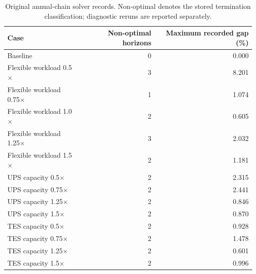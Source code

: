 \begin{table}[htbp]
\centering\small
\caption{Original annual-chain solver records. Non-optimal denotes the stored termination classification; diagnostic reruns are reported separately.}\label{tab:solver-quality}
\begin{tabular}{@{}lrr@{}}\toprule
Case & Non-optimal horizons & Maximum recorded gap (\%) \\\midrule
Baseline & 0 & 0.000 \\
Flexible workload 0.5$\times$ & 3 & 8.201 \\
Flexible workload 0.75$\times$ & 1 & 1.074 \\
Flexible workload 1.0$\times$ & 2 & 0.605 \\
Flexible workload 1.25$\times$ & 3 & 2.032 \\
Flexible workload 1.5$\times$ & 2 & 1.181 \\
UPS capacity 0.5$\times$ & 2 & 2.315 \\
UPS capacity 0.75$\times$ & 2 & 2.441 \\
UPS capacity 1.25$\times$ & 2 & 0.846 \\
UPS capacity 1.5$\times$ & 2 & 0.870 \\
TES capacity 0.5$\times$ & 2 & 0.928 \\
TES capacity 0.75$\times$ & 2 & 1.478 \\
TES capacity 1.25$\times$ & 2 & 0.601 \\
TES capacity 1.5$\times$ & 2 & 0.996 \\
\bottomrule\end{tabular}
\end{table}
